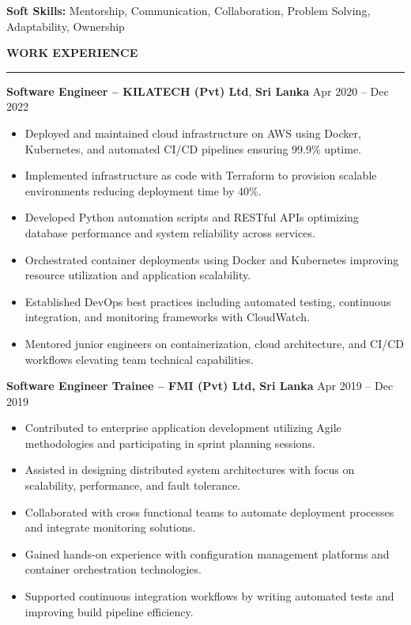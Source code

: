 \documentclass[10pt,letterpaper]{article}
\begin{document}
\textbf{Soft Skills:} Mentorship, Communication, Collaboration, Problem Solving, Adaptability, Ownership

\vspace{8pt}

\textbf{WORK EXPERIENCE}\\[-8pt]
\noindent\rule{\textwidth}{1pt}

\vspace{-2pt}

\textbf{Software Engineer -- KILATECH (Pvt) Ltd}, \textbf{Sri Lanka} \hfill Apr 2020 -- Dec 2022

\vspace{-1pt}

\begin{itemize}
\item Deployed and maintained cloud infrastructure on AWS using Docker, Kubernetes, and automated CI/CD pipelines ensuring 99.9\% uptime.
\item Implemented infrastructure as code with Terraform to provision scalable environments reducing deployment time by 40\%.
\item Developed Python automation scripts and RESTful APIs optimizing database performance and system reliability across services.
\item Orchestrated container deployments using Docker and Kubernetes improving resource utilization and application scalability.
\item Established DevOps best practices including automated testing, continuous integration, and monitoring frameworks with CloudWatch.
\item Mentored junior engineers on containerization, cloud architecture, and CI/CD workflows elevating team technical capabilities.
\end{itemize}

\textbf{Software Engineer Trainee -- FMI (Pvt) Ltd, Sri Lanka} \hfill Apr 2019 -- Dec 2019

\vspace{-1pt}

\begin{itemize}
\item Contributed to enterprise application development utilizing Agile methodologies and participating in sprint planning sessions.
\item Assisted in designing distributed system architectures with focus on scalability, performance, and fault tolerance.
\item Collaborated with cross functional teams to automate deployment processes and integrate monitoring solutions.
\item Gained hands-on experience with configuration management platforms and container orchestration technologies.
\item Supported continuous integration workflows by writing automated tests and improving build pipeline efficiency.
\end{itemize}
\end{document}
